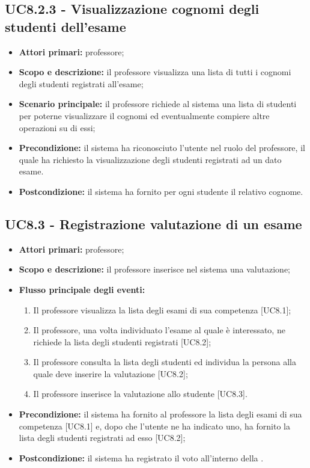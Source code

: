 \documentclass[AnalisiDeiRequisiti.tex]{subfiles}
\begin{document}
\subsection{UC8.2.3 - Visualizzazione cognomi degli studenti dell'esame}
\begin{itemize}
	\item \textbf{Attori primari:} professore;
	\item \textbf{Scopo e descrizione:} il professore visualizza una lista di tutti i cognomi degli studenti registrati all'esame;
	\item \textbf{Scenario principale:} il professore richiede al sistema una lista di studenti per poterne visualizzare il cognomi ed eventualmente compiere altre operazioni su di essi;
	\item \textbf{Precondizione:} il sistema ha riconosciuto l'utente nel ruolo del professore, il quale ha richiesto la visualizzazione degli studenti registrati ad un dato esame.
	\item \textbf{Postcondizione:} il sistema ha fornito per ogni studente il relativo cognome.
\end{itemize}


\subsection{UC8.3 - Registrazione valutazione di un esame}
\begin{itemize}
	\item \textbf{Attori primari:} professore;
	\item \textbf{Scopo e descrizione:} il professore inserisce nel sistema una valutazione;
	\item \textbf{Flusso principale degli eventi:}
	\begin{enumerate}
		\item Il professore visualizza la lista degli esami di sua competenza [UC8.1];
		\item Il professore, una volta individuato l'esame al quale è interessato, ne richiede la lista degli studenti registrati [UC8.2];
		\item Il professore consulta la lista degli studenti ed individua la persona alla quale deve inserire la valutazione [UC8.2];
		\item Il professore inserisce la valutazione allo studente [UC8.3].
	\end{enumerate}
	\item \textbf{Precondizione:} il sistema ha fornito al professore la lista degli esami di sua competenza [UC8.1] e, dopo che l'utente ne ha indicato uno, ha fornito la lista degli studenti registrati ad esso [UC8.2];
	\item \textbf{Postcondizione:} il sistema ha registrato il voto all'interno della .
\end{itemize}
\end{document}

